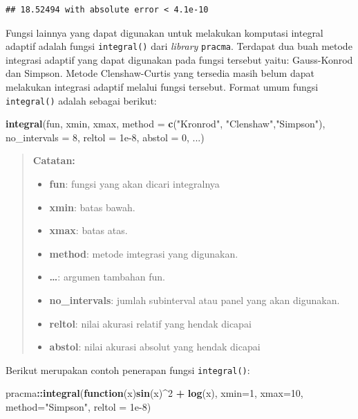 \documentclass[]{book}
\newenvironment{Shaded}{\begin{snugshade}}{\end{snugshade}}
\newcommand{\ControlFlowTok}[1]{\textcolor[rgb]{0.13,0.29,0.53}{\textbf{#1}}}
\newcommand{\DataTypeTok}[1]{\textcolor[rgb]{0.13,0.29,0.53}{#1}}
\newcommand{\DecValTok}[1]{\textcolor[rgb]{0.00,0.00,0.81}{#1}}
\newcommand{\FloatTok}[1]{\textcolor[rgb]{0.00,0.00,0.81}{#1}}
\newcommand{\KeywordTok}[1]{\textcolor[rgb]{0.13,0.29,0.53}{\textbf{#1}}}
\newcommand{\NormalTok}[1]{#1}
\newcommand{\OperatorTok}[1]{\textcolor[rgb]{0.81,0.36,0.00}{\textbf{#1}}}
\newcommand{\StringTok}[1]{\textcolor[rgb]{0.31,0.60,0.02}{#1}}
\providecommand{\tightlist}{%
  \setlength{\itemsep}{0pt}\setlength{\parskip}{0pt}}
\theoremstyle{definition}
\theoremstyle{definition}
\theoremstyle{definition}
\theoremstyle{remark}
\begin{document}
\begin{verbatim}
## 18.52494 with absolute error < 4.1e-10
\end{verbatim}

Fungsi lainnya yang dapat digunakan untuk melakukan komputasi integral adaptif adalah fungsi \texttt{integral()} dari \emph{library} \texttt{pracma}. Terdapat dua buah metode integrasi adaptif yang dapat digunakan pada fungsi tersebut yaitu: Gauss-Konrod dan Simpson. Metode Clenshaw-Curtis yang tersedia masih belum dapat melakukan integrasi adaptif melalui fungsi tersebut. Format umum fungsi \texttt{integral()} adalah sebagai berikut:

\begin{Shaded}
\begin{Highlighting}[]
\KeywordTok{integral}\NormalTok{(fun, xmin, xmax,}
         \DataTypeTok{method =} \KeywordTok{c}\NormalTok{(}\StringTok{"Kronrod"}\NormalTok{, }\StringTok{"Clenshaw"}\NormalTok{,}\StringTok{"Simpson"}\NormalTok{),}
         \DataTypeTok{no_intervals =} \DecValTok{8}\NormalTok{, }\DataTypeTok{reltol =} \FloatTok{1e-8}\NormalTok{, }
         \DataTypeTok{abstol =} \DecValTok{0}\NormalTok{, ...)}
\end{Highlighting}
\end{Shaded}

\begin{quote}
\textbf{Catatan:}

\begin{itemize}
\tightlist
\item
  \textbf{fun}: fungsi yang akan dicari integralnya
\item
  \textbf{xmin}: batas bawah.
\item
  \textbf{xmax}: batas atas.
\item
  \textbf{method}: metode imtegrasi yang digunakan.
\item
  \textbf{\ldots{}}: argumen tambahan fun.
\item
  \textbf{no\_intervals}: jumlah subinterval atau panel yang akan digunakan.
\item
  \textbf{reltol}: nilai akurasi relatif yang hendak dicapai
\item
  \textbf{abstol}: nilai akurasi absolut yang hendak dicapai
\end{itemize}
\end{quote}

Berikut merupakan contoh penerapan fungsi \texttt{integral()}:

\begin{Shaded}
\begin{Highlighting}[]
\NormalTok{pracma}\OperatorTok{::}\KeywordTok{integral}\NormalTok{(}\ControlFlowTok{function}\NormalTok{(x)}\KeywordTok{sin}\NormalTok{(x)}\OperatorTok{^}\DecValTok{2} \OperatorTok{+}\StringTok{ }\KeywordTok{log}\NormalTok{(x),}
          \DataTypeTok{xmin=}\DecValTok{1}\NormalTok{, }\DataTypeTok{xmax=}\DecValTok{10}\NormalTok{, }\DataTypeTok{method=}\StringTok{"Simpson"}\NormalTok{,}
          \DataTypeTok{reltol =} \FloatTok{1e-8}\NormalTok{)}
\end{Highlighting}
\end{Shaded}
\end{document}
